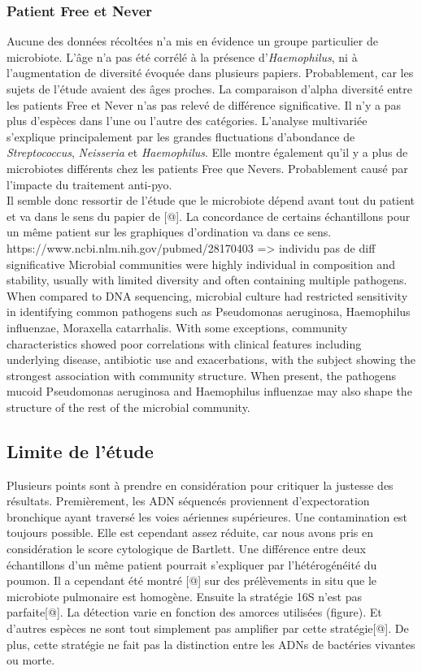 \documentclass[12pt,a4paper]{article}
\begin{document}
\subsubsection{Patient Free et Never}
Aucune des données récoltées n’a mis en évidence un groupe particulier de microbiote. L’âge n’a pas été corrélé à la présence d’\textit{Haemophilus}, ni à l’augmentation de diversité évoquée dans plusieurs papiers. Probablement, car les sujets de l'étude avaient des âges proches. La comparaison d'alpha diversité entre les patients Free et Never n'as pas relevé de différence significative. Il n'y a pas plus d'espèces dans l'une ou l'autre des catégories. 
L'analyse multivariée s'explique principalement par les grandes fluctuations d'abondance de \textit{Streptococcus}, \textit{Neisseria} et \textit{Haemophilus}. Elle montre également qu'il y a plus de microbiotes différents chez les patients Free que Nevers. Probablement causé par l'impacte du traitement anti-pyo.  \\
Il semble donc ressortir de l'étude que le microbiote dépend avant tout du patient et va dans le sens du papier de [@]. La concordance de certains échantillons pour un même patient sur les graphiques d'ordination va dans ce sens. 
https://www.ncbi.nlm.nih.gov/pubmed/28170403 => individu pas de diff significative
Microbial communities were highly individual in composition and stability, usually with limited diversity and often containing multiple pathogens. When compared to DNA sequencing, microbial culture had restricted sensitivity in identifying common pathogens such as Pseudomonas aeruginosa, Haemophilus influenzae, Moraxella catarrhalis. With some exceptions, community characteristics showed poor correlations with clinical features including underlying disease, antibiotic use and exacerbations, with the subject showing the strongest association with community structure. When present, the pathogens mucoid Pseudomonas aeruginosa and Haemophilus influenzae may also shape the structure of the rest of the microbial community.

\subsection{Limite de l'étude}
Plusieurs points sont à prendre en considération pour critiquer la justesse des résultats. Premièrement, les ADN séquencés proviennent d'expectoration bronchique ayant traversé les voies aériennes supérieures. Une contamination est toujours possible. Elle est cependant assez réduite, car nous avons pris en considération le score cytologique de Bartlett.  
Une différence entre deux échantillons d'un même patient pourrait s'expliquer par l'hétérogénéité du poumon. Il a cependant été montré [@] sur des prélèvements in situ que le microbiote pulmonaire est homogène.  
Ensuite la stratégie 16S n'est pas parfaite[@]. La détection varie en fonction des amorces utilisées (figure). Et d'autres espèces ne sont tout simplement pas amplifier par cette stratégie[@]. De plus, cette stratégie ne fait pas la distinction entre les ADNs de bactéries vivantes ou morte.  
\end{document}

